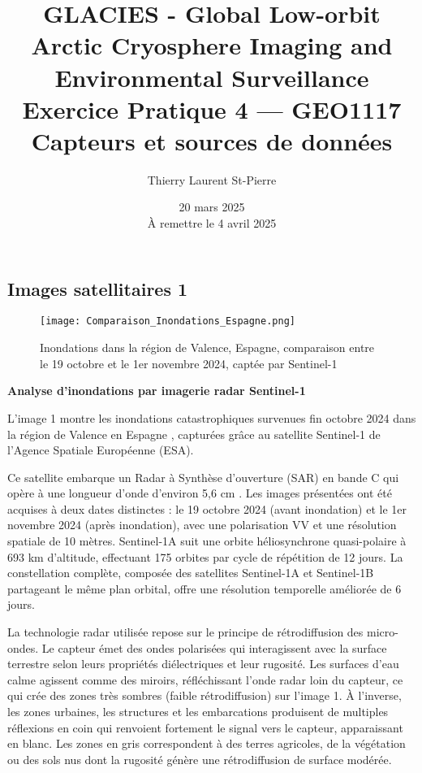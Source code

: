 \documentclass[12pt,a4paper]{article}
\title{
\vspace{2cm}
\Large\textbf{GLACIES - Global Low-orbit Arctic Cryosphere Imaging and Environmental Surveillance\\
Exercice Pratique 4 --- GEO1117 \\
Capteurs et sources de données}
\vspace{1cm}
}
\author{Thierry Laurent St-Pierre}
\date{
20 mars 2025\\
\vspace{1cm}
À remettre le 4 avril 2025
}
\begin{document}
\maketitle

\tableofcontents
\thispagestyle{empty}
\newpage

\subsection{Images satellitaires 1}

\begin{figure}[H]
    \centering
    \texttt{[image: Comparaison\_Inondations\_Espagne.png]}
    \caption{Inondations dans la région de Valence, Espagne, comparaison entre le 19 octobre et le 1er novembre 2024, captée par Sentinel-1}
    \label{fig:image1}
\end{figure}

\textbf{Analyse d'inondations par imagerie radar Sentinel-1}

L'image 1 montre les inondations catastrophiques survenues fin octobre 2024 dans la région de Valence en Espagne \citep{ESA2024}, capturées grâce au satellite Sentinel-1 de l'Agence Spatiale Européenne (ESA). 

Ce satellite embarque un Radar à Synthèse d'ouverture (SAR) en bande C qui opère à une longueur d'onde d'environ 5,6 cm \citep{ESA2023}. Les images présentées ont été acquises à deux dates distinctes : le 19 octobre 2024 (avant inondation) et le 1er novembre 2024 (après inondation), avec une polarisation VV et une résolution spatiale de 10 mètres. Sentinel-1A suit une orbite héliosynchrone quasi-polaire à 693 km d'altitude, effectuant 175 orbites par cycle de répétition de 12 jours. La constellation complète, composée des satellites Sentinel-1A et Sentinel-1B partageant le même plan orbital, offre une résolution temporelle améliorée de 6 jours.

La technologie radar utilisée repose sur le principe de rétrodiffusion des micro-ondes. Le capteur émet des ondes polarisées qui interagissent avec la surface terrestre selon leurs propriétés diélectriques et leur rugosité. Les surfaces d'eau calme agissent comme des miroirs, réfléchissant l'onde radar loin du capteur, ce qui crée des zones très sombres (faible rétrodiffusion) sur l'image 1. À l'inverse, les zones urbaines, les structures et les embarcations produisent de multiples réflexions en coin qui renvoient fortement le signal vers le capteur, apparaissant en blanc. Les zones en gris correspondent à des terres agricoles, de la végétation ou des sols nus dont la rugosité génère une rétrodiffusion de surface modérée.
\end{document}
